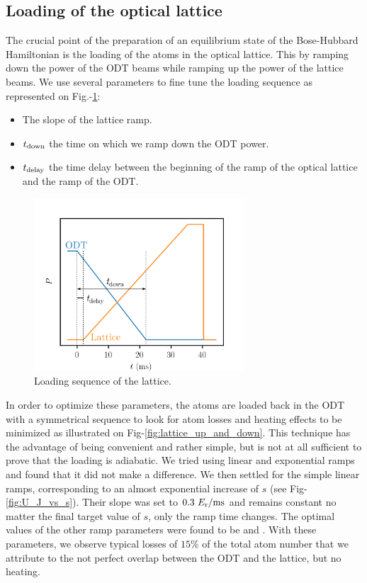 \subsection{Loading of the optical lattice}

The crucial point of the preparation of an equilibrium state of the Bose-Hubbard Hamiltonian is the loading of the atoms in the optical lattice. This by ramping down the power of the ODT beams while ramping up the power of the lattice beams. We use several parameters to fine tune the loading sequence as represented on Fig.-\ref{fig:loading}:

\begin{itemize}
    \item The slope of the lattice ramp.
    \item $t_{\rm{down}}$ the time on which we ramp down the ODT power.
    \item $t_{\rm{delay}}$ the time delay between the beginning of the ramp of the optical lattice and the ramp of the ODT.
\end{itemize}

\begin{figure}
    \centering
    \includegraphics[width=0.7\textwidth]{Fig/Chapter3/loading_good.png}
    \caption{Loading sequence of the lattice.}
    \label{fig:loading}
\end{figure}

In order to optimize these parameters, the atoms are loaded back in the ODT with a symmetrical sequence to look for atom losses and heating effects to be minimized as illustrated on Fig-\ref{fig:lattice_up_and_down}. This technique has the advantage of being convenient and rather simple, but is not at all sufficient to prove that the loading is adiabatic. We tried using linear and exponential ramps and found that it did not make a difference. We then settled for the simple linear ramps, corresponding to an almost exponential increase of $s$ (see Fig-\ref{fig:U_J_vs_s}). Their slope was set to $0.3 \ E_{\rm{r}}/\rm{ms}$ and remains constant no matter the final target value of $s$, only the ramp time changes. The optimal values of the other ramp parameters were found to be  and . With these parameters, we observe typical losses of $15 \%$ of the total atom number that we attribute to the not perfect overlap between the ODT and the lattice, but no heating.


